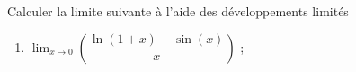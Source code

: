 
\begin{exercice}\label{exoautoanalyseCTU-51devoir}

 
 Calculer la limite suivante à l'aide des développements limités
   \begin{enumerate}
   \item $\displaystyle \lim_{x\to 0}\left(\dfrac{\ln(1+x)-\sin (x)}{x}\right)$ ;

   \end{enumerate}




\end{exercice}
